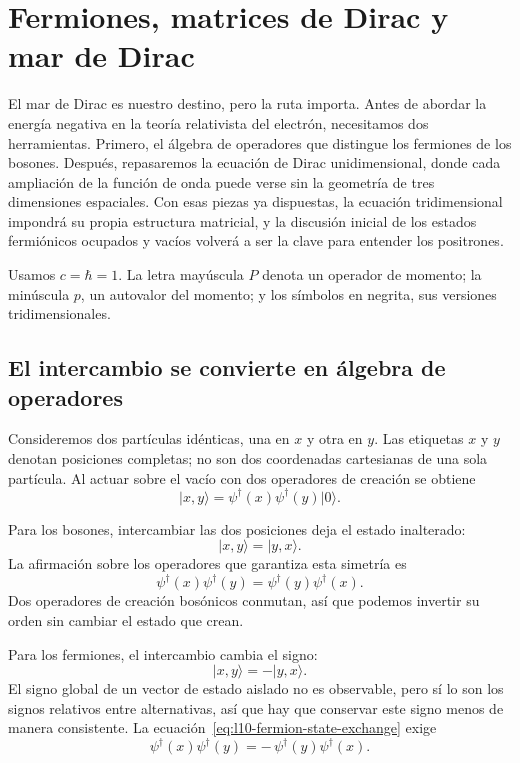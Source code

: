 \chapter{Fermiones, matrices de Dirac y mar de Dirac}

El mar de Dirac es nuestro destino, pero la ruta importa. Antes de abordar la energía negativa en la teoría relativista del electrón, necesitamos dos herramientas. Primero, el álgebra de operadores que distingue los fermiones de los bosones. Después, repasaremos la ecuación de Dirac unidimensional, donde cada ampliación de la función de onda puede verse sin la geometría de tres dimensiones espaciales. Con esas piezas ya dispuestas, la ecuación tridimensional impondrá su propia estructura matricial, y la discusión inicial de los estados fermiónicos ocupados y vacíos volverá a ser la clave para entender los positrones.

Usamos \(c=\hbar=1\). La letra mayúscula \(P\) denota un operador de momento; la minúscula \(p\), un autovalor del momento; y los símbolos en negrita, sus versiones tridimensionales.

\section{El intercambio se convierte en álgebra de operadores}

Consideremos dos partículas idénticas, una en \(x\) y otra en \(y\). Las etiquetas \(x\) y \(y\) denotan posiciones completas; no son dos coordenadas cartesianas de una sola partícula. Al actuar sobre el vacío con dos operadores de creación se obtiene
\begin{equation}
\lvert x,y\rangle
=
\psi^\dagger(x)\psi^\dagger(y)\lvert0\rangle.
\label{eq:l10-two-particle-state}
\end{equation}

Para los bosones, intercambiar las dos posiciones deja el estado inalterado:
\begin{equation}
\lvert x,y\rangle=\lvert y,x\rangle.
\end{equation}
La afirmación sobre los operadores que garantiza esta simetría es
\begin{equation}
\psi^\dagger(x)\psi^\dagger(y)
=
\psi^\dagger(y)\psi^\dagger(x).
\label{eq:l10-boson-exchange}
\end{equation}
Dos operadores de creación bosónicos conmutan, así que podemos invertir su orden sin cambiar el estado que crean.

Para los fermiones, el intercambio cambia el signo:
\begin{equation}
\lvert x,y\rangle=-\lvert y,x\rangle.
\label{eq:l10-fermion-state-exchange}
\end{equation}
El signo global de un vector de estado aislado no es observable, pero sí lo son los signos relativos entre alternativas, así que hay que conservar este signo menos de manera consistente. La ecuación~\eqref{eq:l10-fermion-state-exchange} exige
\begin{equation}
\psi^\dagger(x)\psi^\dagger(y)
=
-\,\psi^\dagger(y)\psi^\dagger(x).
\label{eq:l10-fermion-operator-exchange}
\end{equation}

